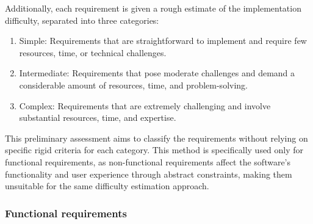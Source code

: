 Additionally, each requirement is given a rough estimate of the implementation difficulty, separated into three categories:
\begin{enumerate}
    \item Simple: Requirements that are straightforward to implement and require few resources, time, or technical challenges.
    \item Intermediate: Requirements that pose moderate challenges and demand a considerable amount of resources, time, and problem-solving.
    \item Complex: Requirements that are extremely challenging and involve substantial resources, time, and expertise.
\end{enumerate}
This preliminary assessment aims to classify the requirements without relying on specific rigid criteria for each category. This method is specifically used only for functional requirements, as non-functional requirements affect the software's functionality and user experience through abstract constraints, making them unsuitable for the same difficulty estimation approach.
\subsubsection{Functional requirements}

